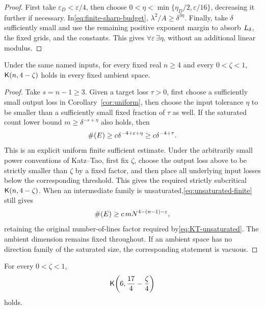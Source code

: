 \begin{proof}
First take $\varepsilon_D<\varepsilon/4$, then choose
$0<\eta<\min\{\eta_D/2,\varepsilon/16\}$, decreasing it further if necessary.
In\eqref{eq:finite-sharp-budget}, $\lambda^2/A\ge\delta^{3\eta}$.
Finally, take $\delta$ sufficiently small and use the remaining positive exponent margin to absorb $L_\delta$, the fixed grids, and the constants.
This gives $\forall\varepsilon\,\exists\eta$, without an additional linear modulus.
\end{proof}

\begin{corollary}\label{cor:seed}
Under the same named inputs, for every fixed real $n\ge4$ and every $0<\zeta<1$,
$\mathsf K(n,4-\zeta)$ holds in every fixed ambient space.
\end{corollary}

\begin{proof}
Take $s=n-1\ge3$.
Given a target loss $\tau>0$, first choose a sufficiently small output loss in Corollary~\ref{cor:uniform},
then choose the input tolerance $\eta$ to be smaller than a sufficiently small fixed fraction of $\tau$ as well.
If the saturated count lower bound $m\ge\delta^{-s+\eta}$ also holds, then
\[
 \#\!\left(E\right)\ge c\delta^{-4+\varepsilon+\eta}
            \ge c\delta^{-4+\tau}.
\]
This is an explicit uniform finite sufficient estimate.
Under the arbitrarily small power conventions of Katz--Tao, first fix $\zeta$,
choose the output loss above to be strictly smaller than $\zeta$ by a fixed factor,
and then place all underlying input losses below the corresponding threshold.
This gives the required strictly subcritical $\mathsf K(n,4-\zeta)$.
When an intermediate family is unsaturated,\eqref{eq:unsaturated-finite} still gives
\[
 \#\!\left(E\right)\ge c\,mN^{4-(n-1)-\varepsilon},
\]
retaining the original number-of-lines factor required by\eqref{eq:KT-unsaturated}.
The ambient dimension remains fixed throughout. If an ambient space has no direction family of the saturated size,
the corresponding statement is vacuous.
\end{proof}

\begin{proposition}\label{prop:six}
For every $0<\zeta<1$,
\begin{equation}\label{eq:six-finite}
 \mathsf K\!\left(6,\frac{17}{4}-\frac{\zeta}{4}\right)
\end{equation}
holds.
\end{proposition}

